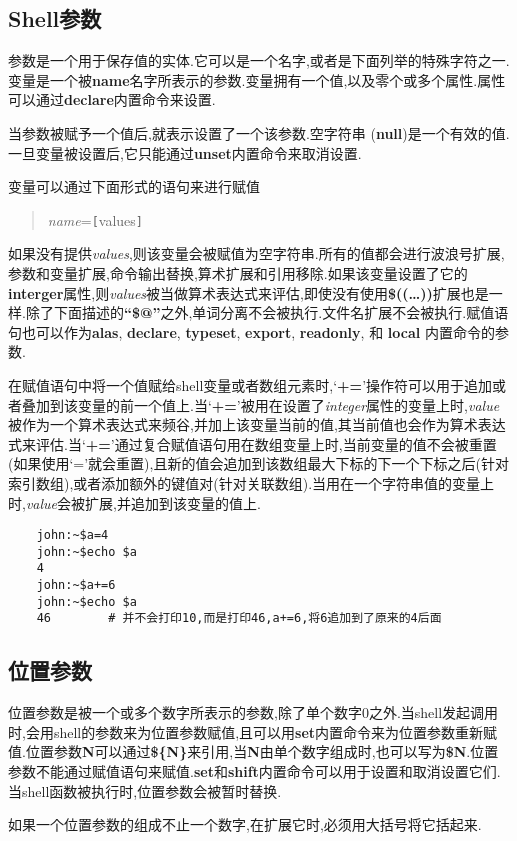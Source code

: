 \documentclass[draft,openany]{book}
\begin{document}
\begin{CJK}{UTF8}{gbsn}
    \section{Shell参数}
    参数是一个用于保存值的实体.它可以是一个名字,或者是下面列举的特殊字符之一.变量是一个被\textbf{name}名字所表示的参数.变量拥有一个值,以及零个或多个属性.属性可以通过\textbf{declare}内置命令来设置.\par
    当参数被赋予一个值后,就表示设置了一个该参数.空字符串 (\textbf{null})是一个有效的值.一旦变量被设置后,它只能通过\textbf{unset}内置命令来取消设置.\par
    变量可以通过下面形式的语句来进行赋值
    \begin{quote}
        \emph{name}=\verb+[+values\verb+]+
    \end{quote}
    如果没有提供\emph{values},则该变量会被赋值为空字符串.所有的值都会进行波浪号扩展,参数和变量扩展,命令输出替换,算术扩展和引用移除.如果该变量设置了它的\textbf{interger}属性,则\emph{values}被当做算术表达式来评估,即使没有使用\textbf{\$((\ldots))}扩展也是一样.除了下面描述的\textbf{``\$@''}之外,单词分离不会被执行.文件名扩展不会被执行.赋值语句也可以作为\textbf{alas}, \textbf{declare}, \textbf{typeset}, \textbf{export}, \textbf{readonly}, 和 \textbf{local} 内置命令的参数.\par
    在赋值语句中将一个值赋给shell变量或者数组元素时,`\textbf{+=}'操作符可以用于追加或者叠加到该变量的前一个值上.当`\textbf{+=}'被用在设置了\emph{integer}属性的变量上时,\emph{value}被作为一个算术表达式来频谷,并加上该变量当前的值,其当前值也会作为算术表达式来评估.当`\textbf{+=}'通过复合赋值语句用在数组变量上时,当前变量的值不会被重置(如果使用`='就会重置),且新的值会追加到该数组最大下标的下一个下标之后(针对索引数组),或者添加额外的键值对(针对关联数组).当用在一个字符串值的变量上时,\emph{value}会被扩展,并追加到该变量的值上.
    \begin{verbatim}
    john:~$a=4
    john:~$echo $a
    4
    john:~$a+=6
    john:~$echo $a
    46        # 并不会打印10,而是打印46,a+=6,将6追加到了原来的4后面
    \end{verbatim}

    \subsection{位置参数}
    位置参数是被一个或多个数字所表示的参数,除了单个数字0之外.当shell发起调用时,会用shell的参数来为位置参数赋值,且可以用\textbf{set}内置命令来为位置参数重新赋值.位置参数\textbf{N}可以通过\textbf{\$\{N\}}来引用,当\textbf{N}由单个数字组成时,也可以写为\textbf{\$N}.位置参数不能通过赋值语句来赋值.\textbf{set}和\textbf{shift}内置命令可以用于设置和取消设置它们.当shell函数被执行时,位置参数会被暂时替换.\par
    如果一个位置参数的组成不止一个数字,在扩展它时,必须用大括号将它括起来.


\end{CJK}
\end{document}
